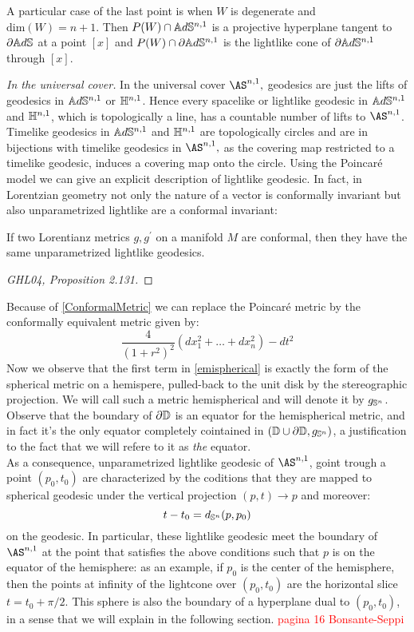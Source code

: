 A particular case of the last point is when $W$ is degenerate and $\text{dim}(W)=n+1.$ Then $P(W)\cap \A^{n,1}$ is a projective hyperplane tangent to $\partial\A$ at a point $[x]$ and $P(W)\cap \partial\A^{n,1}$ is the lightlike cone of $\partial\A^{n,1}$ through $[x]$.  

\textit{In the universal cover.} In the universal cover $\AS^{n,1},$ geodesics are just the lifts of geodesics in $\A^{n,1}$ or $\H^{n,1}$. Hence every spacelike or lightlike geodesic in $\A^{n,1}$ and $\H^{n,1}$, which is topologically a line, has a countable number of lifts to $\AS^{n,1}$. Timelike geodesics in $\A^{n,1}$ and $\H^{n,1}$ are topologically circles and are in bijections with timelike geodesics in $\AS^{n,1},$ as the covering map restricted to a timelike geodesic, induces a covering map onto the circle. Using the Poincaré model we can give an explicit description of lightlike geodesic. In fact, in Lorentzian geometry not only the nature of a vector is conformally invariant but also unparametrized lightlike are a conformal invariant: 
\begin{theorem}\label{ConformalMetric} If two Lorentianz metrics $g,g^{\prime} $ on a manifold $M$ are conformal, then they have the same unparametrized lightlike geodesics.
\end{theorem}
\begin{proof}
    [GHL04, Proposition 2.131]
\end{proof}
Because of \ref{ConformalMetric} we can replace the Poincaré metric by the conformally equivalent metric given by:
\begin{equation}\label{emispherical}
    \frac{4}{(1+r^2)^2}(dx_1^2+\dots+dx_n^2)-dt^2
\end{equation} 
Now we observe that the first term in \ref{emispherical} is exactly the form of the spherical metric on a hemispere, pulled-back to the unit disk by the stereographic projection. We will call such a metric hemispherical and will denote it by $g_{\S^n}$. Observe that the boundary of $\partial\D$ is an equator for the hemispherical metric, and in fact it's the only equator completely cointained in $(\D\cup\partial\D,g_{\S^n})$, a justification to the fact that we will refere to it as \textit{the} equator.\\
As a consequence, unparametrized lightlike geodesic of $\AS^{n,1}$, goint trough a point $(p_0,t_0)$ are characterized by the coditions that they are mapped to spherical geodesic under the vertical projection $(p,t)\to p$ and moreover: 
\[
    t-t_0=d_{\S^n}(p,p_0)
\] on the geodesic.  In particular, these lightlike geodesic meet the boundary of $\AS^{n,1}$ at the point that satisfies the above conditions such that $p$ is on the equator of the hemisphere: as an example, if $p_0$ is the center of the hemisphere, then the points at infinity of the lightcone over $(p_0,t_0)$ are the horizontal slice $t=t_{0}+\pi/2.$ This sphere is also the boundary of a hyperplane dual to $(p_0,t_0)$, in a sense that we will explain in the following section. 
\textcolor{red}{pagina 16 Bonsante-Seppi}   
